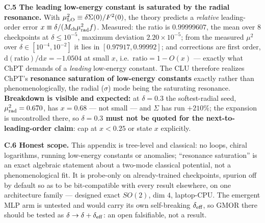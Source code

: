 \documentclass{article}
\begin{document}
\textbf{C.5 The leading low-energy constant is saturated by the radial resonance.} With $\mu^2_{\rm LO}\equiv\delta\Sigma(0)/F^2(0)$, the theory predicts a \emph{relative} leading-order error $x\equiv\delta/(M_{\rm ch}\mu_{\rm rad}^2f)$. Measured: the ratio is $0.99999607$, the mean over $8$ checkpoints at $\delta\le10^{-5}$, maximum deviation $2.20{\times}10^{-5}$; from the measured $\mu^2$ over $\delta\in[10^{-4},10^{-2}]$ it lies in $[0.97917,0.99992]$; and corrections are first order, $\mathrm{d}(\text{ratio})/\mathrm{d}x=-1.0504$ at small $x$, i.e.\ $\text{ratio}=1-O(x)$ --- exactly what ChPT demands of a \emph{leading} low-energy constant. The CLU therefore realizes ChPT's \textbf{resonance saturation of low-energy constants} exactly rather than phenomenologically, the radial ($\sigma$) mode being the saturating resonance. \textbf{Breakdown is visible and expected:} at $\delta=0.3$ the softest-radial seed, $\mu_{\rm rad}^2=0.670$, has $x=0.68$ --- not small --- and $\Sigma$ has run $+210\%$; the expansion is uncontrolled there, so \textbf{$\delta=0.3$ must not be quoted for the next-to-leading-order claim}: cap at $x<0.25$ or state $x$ explicitly.

\textbf{C.6 Honest scope.} This appendix is tree-level and classical: no loops, chiral logarithms, running low-energy constants or anomalies; ``resonance saturation'' is an exact algebraic statement about a two-mode classical potential, not a phenomenological fit. It is probe-only on already-trained checkpoints, spurion off by default so as to be bit-compatible with every result elsewhere, on one architecture family --- designed exact $SO(2)$, dim $4$, laptop-CPU. The emergent MLP arm is untested and would carry its own self-breaking $\delta_{\rm eff}$, so GMOR there should be tested as $\delta\to\delta+\delta_{\rm eff}$: an open falsifiable, not a result.
\end{document}
